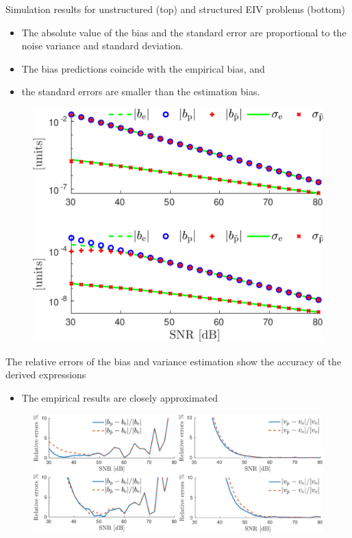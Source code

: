 \documentclass[presentation]{beamer}
\begin{document}
\begin{frame}[label={slide:statistical8}]{Simulation results for unstructured (top) and \linebreak structured EIV problems (bottom)}
\begin{itemize}
\item The absolute value of the bias and the standard error are proportional to the noise variance and standard deviation.
\item The bias predictions coincide with the empirical bias, and 
\item the standard errors are smaller than the estimation bias.
\end{itemize}
\begin{figure}[htb!]
\centering
\includegraphics[width=0.55\columnwidth]{./fig/Stat_Fig_1.pdf} 
\end{figure}
\end{frame}

\begin{frame}[label={slide:statistical9}]{The relative errors of the bias and variance estimation show the accuracy of the derived expressions}
\begin{itemize}
\item The empirical results are closely approximated 
\end{itemize}
\begin{figure}[htb!]
\centering
\includegraphics[width=1\columnwidth]{./fig/Stat_Fig_2.pdf} 
\end{figure}
\end{frame}
\end{document}
